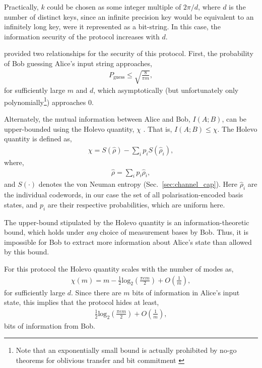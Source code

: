\documentclass[aps,rmp,twocolumn,amsmath,amssymb,nofootinbib,superscriptaddress,longbibliography,floatfix,table-of-contents,eqsecnum]{revtex4-1}
\begin{document}
Practically, $k$ could be chosen as some integer multiple of \mbox{$2\pi/d$}, where $d$ is the number of distinct keys, since an infinite precision key would be equivalent to an infinitely long key, were it represented as a bit-string. In this case, the information security of the protocol increases with $d$.

\cite{bib:RohdeQWEnc12} provided two relationships for the security of this protocol. First, the probability of Bob guessing Alice's input string approaches,
\begin{align}
P_\text{guess} \leq \sqrt{\frac{8}{\pi m}},
\end{align}
for sufficiently large $m$ and $d$, which asymptotically (but unfortunately only polynomially\footnote{Note that an exponentially small bound is actually prohibited by no-go theorems for oblivious transfer and bit commitment \cite{bib:HKLo97, bib:SpekkensRudolphSecure}}) approaches 0.

Alternately, the mutual information between Alice and Bob, \mbox{$I(A;B)$}, can be upper-bounded using the Holevo quantity, $\chi$ \cite{HolevoQuantity}. That is, \mbox{$I(A;B)\leq\chi$}. The Holevo quantity is defined as,
\begin{align}
\chi = S(\hat\rho) - \sum_i p_i S(\hat\rho_i),
\end{align}
where,
\begin{align}
\hat\rho = \sum_i p_i \hat\rho_i,
\end{align}
and $S(\cdot)$ denotes the von Neuman entropy (Sec.~\ref{sec:channel_cap}). Here $\hat\rho_i$ are the individual codewords, in our case the set of all polarisation-encoded basis states, and $p_i$ are their respective probabilities, which are uniform here.

The upper-bound stipulated by the Holevo quantity is an information-theoretic bound, which holds under \textit{any} choice of measurement bases by Bob. Thus, it is impossible for Bob to extract more information about Alice's state than allowed by this bound.

For this protocol the Holevo quantity scales with the number of modes as,
\begin{align}
\chi(m) = m - \frac{1}{2}\text{log}_2\left(\frac{\pi e m}{2}\right) + O\left(\frac{1}{m}\right),
\end{align}
for sufficiently large $d$. Since there are $m$ bits of information in Alice's input state, this implies that the protocol hides at least,
\begin{align}
\frac{1}{2}\text{log}_2\left(\frac{\pi e m}{2}\right) + O\left(\frac{1}{m}\right),
\end{align}
bits of information from Bob.
\end{document}
